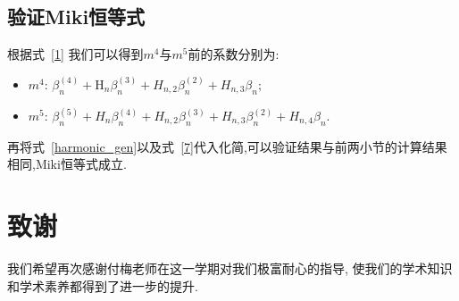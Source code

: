 \documentclass{CombPaper}
\begin{document}
\subsection{验证Miki恒等式}
根据式~\eqref{1} 我们可以得到$m^{4}$与$m^{5}$前的系数分别为:\par
\begin{itemize}
    \item $m^{4}$: $\beta_{n}^{(4)}+\mathrm{H}_{n} \beta_{n}^{(3)}+H_{n, 2} \beta_{n}^{(2)}+H_{n, 3} \beta_{n};$
    \item $m^{5}$: $\beta_{n}^{(5)}+H_{n} \beta_{n}^{(4)}+H_{n, 2} \beta_{n}^{(3)}+H_{n, 3} \beta_{n}^{(2)}+H_{n, 4} \beta_{n}.$
\end{itemize}\par
再将式~\eqref{harmonic_gen}以及式~\eqref{7}代入化简,可以验证结果与前两小节的计算结果相同,Miki恒等式成立.
\section*{致谢}
我们希望再次感谢付梅老师在这一学期对我们极富耐心的指导, 使我们的学术知识和学术素养都得到了进一步的提升.

% 

\end{document}
